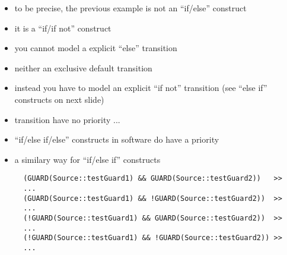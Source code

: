 \begin{frame}[fragile=singleslide]
\begin{itemize}
\item to be precise, the previous example is not an ``if/else'' construct
\item it is a ``if/if not'' construct
\item you cannot model a explicit ``else'' transition
\item neither an exclusive default transition
\item instead you have to model an explicit ``if not'' transition (see ``else if'' constructs on next slide)
\item transition have no priority ...
\item ``if/else if/else'' constructs in software do have a priority
\end{itemize}
\end{frame}





\begin{frame}[fragile=singleslide]
\begin{itemize}
\item a similary way for ``if/else if'' constructs
\begin{lstlisting}
  (GUARD(Source::testGuard1) && GUARD(Source::testGuard2))   >>
  ...
  (GUARD(Source::testGuard1) && !GUARD(Source::testGuard2))  >>
  ...
  (!GUARD(Source::testGuard1) && GUARD(Source::testGuard2))  >>
  ...
  (!GUARD(Source::testGuard1) && !GUARD(Source::testGuard2)) >>
  ...
\end{lstlisting}
\end{itemize}
\end{frame}













